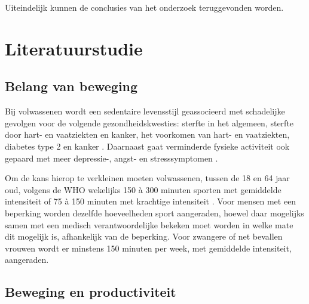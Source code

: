 Uiteindelijk kunnen de conclusies van het onderzoek teruggevonden worden.





\section{Literatuurstudie}%
\label{sec:state-of-the-art}

\subsection{Belang van beweging}
Bij volwassenen wordt een sedentaire levensstijl geassocieerd met schadelijke gevolgen voor de volgende gezondheidskwesties: sterfte in het algemeen, sterfte door hart- en vaatziekten en kanker, het voorkomen van hart- en vaatziekten, diabetes type 2 en kanker \autocite{Bull2020}. Daarnaast gaat verminderde fysieke activiteit ook gepaard met meer depressie-, angst- en stresssymptomen \autocite{Stanton2020}.

Om de kans hierop te verkleinen moeten volwassenen, tussen de 18 en 64 jaar oud, volgens de WHO wekelijks 150 à 300 minuten sporten met gemiddelde intensiteit of 75 à 150 minuten met krachtige intensiteit \autocite{Bull2020}. Voor mensen met een beperking worden dezelfde hoeveelheden sport aangeraden, hoewel daar mogelijks samen met een medisch verantwoordelijke bekeken moet worden in welke mate dit mogelijk is, afhankelijk van de beperking. Voor zwangere of net bevallen vrouwen wordt er minstens 150 minuten per week, met gemiddelde intensiteit, aangeraden.

\subsection{Beweging en productiviteit}

